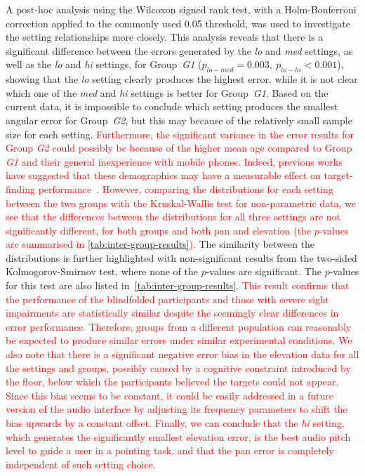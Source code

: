 \documentclass[acmsmall]{acmart}
\newcommand\hl[1]{\textcolor{red}{#1}}
\begin{document}
A post-hoc analysis using the Wilcoxon signed rank test, with a Holm-Bonferroni correction applied to the commonly used 0.05 threshold, was used to investigate the setting relationships more closely. 
This analysis reveals that there is a significant difference between the errors generated by the \textit{lo} and \textit{med} settings, as well as the \textit{lo} and \textit{hi} settings, for Group~\textit{G1} ($p_{lo-med} = 0.003,~p_{lo-hi} < 0.001$), showing that the \textit{lo} setting clearly produces the highest error, while it is not clear which one of the \textit{med} and \textit{hi} settings is better for Group~\textit{G1}. 
Based on the current data, it is impossible to conclude which setting produces the smallest angular error for Group~\textit{G2}, but this may because of the relatively small sample size for each setting. 
\hl{Furthermore, the significant variance in the error results for Group \textit{G2} could possibly be because of the higher mean age compared to Group \textit{G1} and their general inexperience with mobile phones.
Indeed, previous works have suggested that these demographics may have a measurable effect on target-finding performance~\citep{millar1994understanding,pring2008psychological}.
However, comparing the distributions for each setting between the two groups with the Kruskal-Wallis test for non-parametric data, we see that the differences between the distributions for all three settings are not significantly different, for both groups and both pan and elevation (the $p$-values are summarised in \cref{tab:inter-group-results}).}
The similarity between the distributions is further highlighted with non-significant results from the two-sided Kolmogorov-Smirnov test, where none of the $p$-values are significant.
The $p$-values for this test are also listed in~\cref{tab:inter-group-results}.
\hl{This result confirms that the performance of the blindfolded participants and those with severe sight impairments are statistically similar despite the seemingly clear differences in error performance.
Therefore, groups from a different population can reasonably be expected to produce similar errors under similar experimental conditions. 
We also note that there is a significant negative error bias in the elevation data for all the settings and groups, possibly caused by a cognitive constraint introduced by the floor, below which the participants believed the targets could not appear.
Since this bias seems to be constant, it could be easily addressed in a future version of the audio interface by adjusting its frequency parameters to shift the bias upwards by a constant offset. 
Finally, we can conclude that the \textit{hi} setting, which generates the significantly smallest elevation error, is the best audio pitch level to guide a user in a pointing task, and that the pan error is completely independent of such setting choice. }
\end{document}
